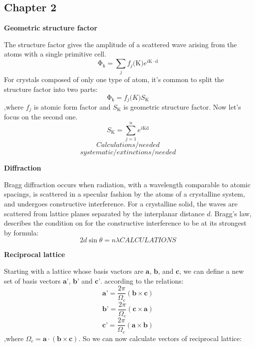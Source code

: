 \subsection{Chapter 2}

\textbf{Geometric structure factor}

The structure factor gives the amplitude of a scattered wave arising
from the atoms with a single primitive cell. 
\begin{equation}
\mathrm{\Phi_k} = \sum_{j} f_j(\mathrm{K)}e^{i\mathrm{K \cdot d}}
\end{equation}
For crystals composed of only one type of atom, it’s common to split
the structure factor into two parts:
\begin{equation}
\mathrm{\Phi_k} = f_j\mathrm(K)S_{\mathrm{K}}
\end{equation}
,where $f_j$ is atomic form factor and $S_\mathrm{K}$ is geometric structure factor. Now let's focus on the second one.
\begin{equation}
S_\mathrm{K} = \sum_{j = 1}^{n} e^{i \mathrm{Kd}}
\end{equation}
\begin{displaymath}
Calculations/needed
\end{displaymath}
\begin{displaymath}
systematic/extinctions/needed
\end{displaymath}

\textbf{Diffraction}

Bragg diffraction occurs when radiation, with a wavelength comparable to atomic spacings, is scattered in a specular fashion by the atoms of a crystalline system, and undergoes constructive interference. For a crystalline solid, the waves are scattered from lattice planes separated by the interplanar distance $d$. Bragg's law,  describes the condition on for the constructive interference to be at its strongest by formula:
\begin{equation}
2d \sin{\theta} = n \lambda
CALCULATIONS
\end{equation}

\textbf{Reciprocal lattice}

Starting with a lattice whose basis vactors are $\textbf{a}$, $\textbf{b}$, and $\textbf{c}$, we can define a new set of basis vectors $\textbf{a'}$, $\textbf{b'}$ and $\textbf{c'}$. according to the relations:
\begin{equation}
\textbf{a'} = \frac{2 \pi}{\Omega_c} (\textbf{b} \times \textbf{c})
\end{equation}
\begin{equation}
\textbf{b'} = \frac{2 \pi}{\Omega_c} (\textbf{c} \times \textbf{a})
\end{equation}
\begin{equation}
\textbf{c'} = \frac{2 \pi}{\Omega_c} (\textbf{a} \times \textbf{b})
\end{equation}
,where $\Omega_c = \textbf{a} \cdot (\textbf{b} \times \textbf{c})$. So we can now calculate vectors of reciprocal lattice:

